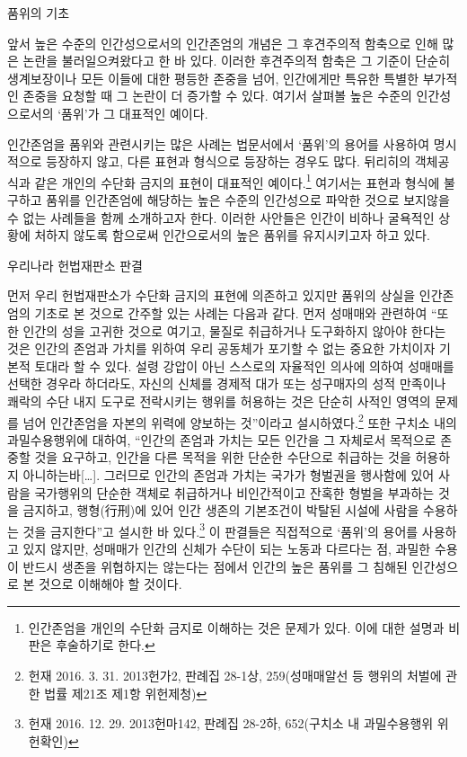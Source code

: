 품위의 기초

앞서 높은 수준의 인간성으로서의 인간존엄의 개념은 그 후견주의적 함축으로 인해 많은 논란을 불러일으켜왔다고 한 바 있다. 이러한 후견주의적 함축은 그 기준이 단순히 생계보장이나 모든 이들에 대한 평등한 존중을 넘어, 인간에게만 특유한 특별한 부가적인 존중을 요청할 때 그 논란이 더 증가할 수 있다. 여기서 살펴볼 높은 수준의 인간성으로서의 `품위'가 그 대표적인 예이다.

인간존엄을 품위와 관련시키는 많은 사례는 법문서에서 `품위'의 용어를 사용하여 명시적으로 등장하지 않고, 다른 표현과 형식으로 등장하는 경우도 많다. 뒤리히의 객체공식과 같은 개인의 수단화 금지의 표현이 대표적인 예이다.\footnote{인간존엄을 개인의 수단화 금지로 이해하는 것은 문제가 있다. 이에 대한 설명과 비판은 후술하기로 한다.} 여기서는 표현과 형식에 불구하고 품위를 인간존엄에 해당하는 높은 수준의 인간성으로 파악한 것으로 보지않을 수 없는 사례들을 함께 소개하고자 한다. 이러한 사안들은 인간이 비하나 굴욕적인 상황에 처하지 않도록 함으로써 인간으로서의 높은 품위를 유지시키고자 하고 있다.

우리나라 헌법재판소 판결

먼저 우리 헌법재판소가 수단화 금지의 표현에 의존하고 있지만 품위의 상실을 인간존엄의 기초로 본 것으로 간주할 있는 사례는 다음과 같다. 먼저 성매매와 관련하여 ``또한 인간의 성을 고귀한 것으로 여기고, 물질로 취급하거나 도구화하지 않아야 한다는 것은 인간의 존엄과 가치를 위하여 우리 공동체가 포기할 수 없는 중요한 가치이자 기본적 토대라 할 수 있다. 설령 강압이 아닌 스스로의 자율적인 의사에 의하여 성매매를 선택한 경우라 하더라도, 자신의 신체를 경제적 대가 또는 성구매자의 성적 만족이나 쾌락의 수단 내지 도구로 전락시키는 행위를 허용하는 것은 단순히 사적인 영역의 문제를 넘어 인간존엄을 자본의 위력에 양보하는 것''이라고 설시하였다.\footnote{헌재 2016. 3. 31. 2013헌가2, 판례집 28-1상, 259(성매매알선 등 행위의 처벌에 관한 법률 제21조 제1항 위헌제청)} 또한 구치소 내의 과밀수용행위에 대하여, ``인간의 존엄과 가치는 모든 인간을 그 자체로서 목적으로 존중할 것을 요구하고, 인간을 다른 목적을 위한 단순한 수단으로 취급하는 것을 허용하지 아니하는바{[}\ldots{]}. 그러므로 인간의 존엄과 가치는 국가가 형벌권을 행사함에 있어 사람을 국가행위의 단순한 객체로 취급하거나 비인간적이고 잔혹한 형벌을 부과하는 것을 금지하고, 행형(行刑)에 있어 인간 생존의 기본조건이 박탈된 시설에 사람을 수용하는 것을 금지한다''고 설시한 바 있다.\footnote{헌재 2016. 12. 29. 2013헌마142, 판례집 28-2하, 652(구치소 내 과밀수용행위 위헌확인)} 이 판결들은 직접적으로 `품위'의 용어를 사용하고 있지 않지만, 성매매가 인간의 신체가 수단이 되는 노동과 다르다는 점, 과밀한 수용이 반드시 생존을 위협하지는 않는다는 점에서 인간의 높은 품위를 그 침해된 인간성으로 본 것으로 이해해야 할 것이다.

